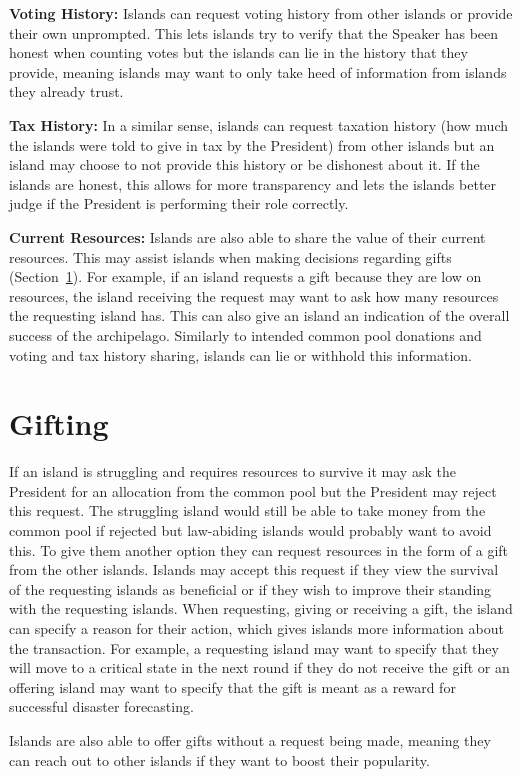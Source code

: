 \textbf{Voting History: }Islands can request voting history from other islands or provide their own unprompted. This lets islands try to verify that the Speaker has been honest when counting votes but the islands can lie in the history that they provide, meaning islands may want to only take heed of information from islands they already trust. 

\textbf{Tax History: }In a similar sense, islands can request taxation history (how much the islands were told to give in tax by the President) from other islands but an island may choose to not provide this history or be dishonest about it. If the islands are honest, this allows for more transparency and lets the islands better judge if the President is performing their role correctly.

\textbf{Current Resources: }Islands are also able to share the value of their current resources. This may assist islands when making decisions regarding gifts (Section~\ref{sec:IITO:gifting}). For example, if an island requests a gift because they are low on resources, the island receiving the request may want to ask how many resources the requesting island has. This can also give an island an indication of the overall success of the archipelago. Similarly to intended common pool donations and voting and tax history sharing, islands can lie or withhold this information.

\section{Gifting}  
\label{sec:IITO:gifting}  

If an island is struggling and requires resources to survive it may ask the President for an allocation from the common pool but the President may reject this request. The struggling island would still be able to take money from the common pool if rejected but law-abiding islands would probably want to avoid this. To give them another option they can request resources in the form of a gift from the other islands. Islands may accept this request if they view the survival of the requesting islands as beneficial or if they wish to improve their standing with the requesting islands. When requesting, giving or receiving a gift, the island can specify a reason for their action, which gives islands more information about the transaction. For example, a requesting island may want to specify that they will move to a critical state in the next round if they do not receive the gift or an offering island may want to specify that the gift is meant as a reward for successful disaster forecasting.

Islands are also able to offer gifts without a request being made, meaning they can reach out to other islands if they want to boost their popularity.